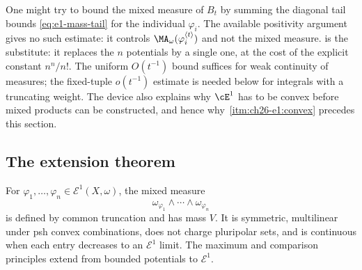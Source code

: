 \begin{remark}
\label{rem:ch26-why-average}
One might try to bound the mixed measure of $B_t$ by summing the diagonal
tail bounds \eqref{eq:e1-mass-tail} for the individual $\varphi_i$.  The
available positivity argument gives no such estimate: it controls
$\MA_\omega(\varphi_i^{\langle t\rangle})$ and not the mixed measure.
 is the
substitute: it replaces the $n$ potentials by a single one, at the cost of
the explicit constant $n^n/n!$.  The uniform $O(t^{-1})$ bound suffices
for weak continuity of measures; the fixed-tuple $o(t^{-1})$ estimate is
needed below for integrals with a truncating weight.  The device also explains why $\cE^1$ has to be
convex before mixed products can be constructed, and hence why
\,\cref{itm:ch26-e1:convex} precedes this section.
\end{remark}

\subsection{The extension theorem}
\label{sec:ch26-extension-theorem}

\begin{theorem}\label{thm:e1-mixed-products}
For $\varphi_1,\ldots,\varphi_n\in\mathcal E^1(X,\omega)$, the mixed
measure
\[
       \omega_{\varphi_1}\wedge\cdots\wedge\omega_{\varphi_n}
\]
is defined by common truncation and has mass $V$. It is symmetric,
multilinear under psh convex combinations, does not charge pluripolar sets,
and is continuous when each entry decreases to an $\mathcal E^1$ limit.
The maximum and comparison principles extend from bounded potentials to
$\mathcal E^1$.
\end{theorem}

